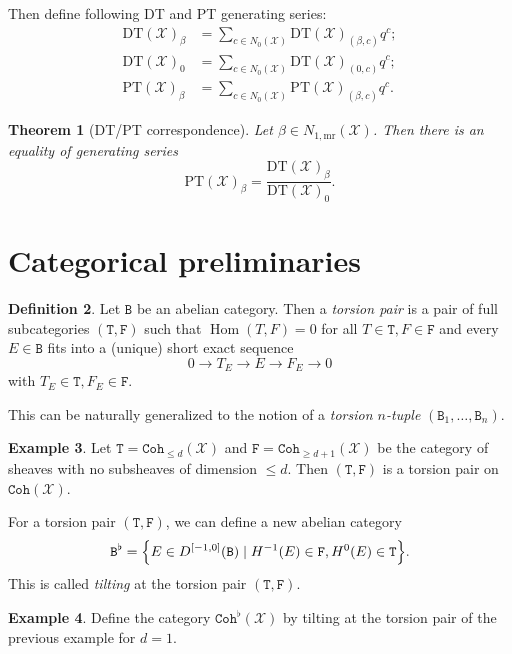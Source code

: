 \documentclass[leqno, openany]{memoir}
\newtheorem{thm}{Theorem}[section]
\theoremstyle{definition}
\newtheorem{defn}[thm]{Definition}
\newtheorem{exm}[thm]{Example}
\theoremstyle{remark}
\theoremstyle{plain}
\theoremstyle{definition}
\theoremstyle{remark}
\newcommand{\mc}[1]{\mathcal{#1}}
\newcommand{\mr}[1]{\mathrm{#1}}
\newcommand{\mt}[1]{\mathtt{#1}}
\DeclareMathOperator{\Hom}{Hom}
\begin{document}
Then define following DT and PT generating series:
\begin{align*}
    \mr{DT}(\mc{X})_{\beta} &= \sum_{c \in N_0(\mc{X})} \mr{DT}(\mc{X})_{(\beta, c)} q^c; \\
    \mr{DT}(\mc{X})_{0} &= \sum_{c \in N_0(\mc{X})} \mr{DT}(\mc{X})_{(0, c)} q^c; \\
    \mr{PT}(\mc{X})_{\beta} &= \sum_{c \in N_0(\mc{X})} \mr{PT}(\mc{X})_{(\beta, c)} q^c.
\end{align*}

\begin{thm}[DT/PT correspondence]
    Let $\beta \in N_{1, \mr{mr}}(\mc{X})$. Then there is an equality of generating series
    \[ \mr{PT}(\mc{X})_{\beta} = \frac{\mr{DT}(\mc{X})_{\beta}}{\mr{DT}(\mc{X})_0}. \]
\end{thm}

\section{Categorical preliminaries}

\begin{defn}
    Let $\mt{B}$ be an abelian category. Then a \textit{torsion pair} is a pair of full subcategories $(\mt{T}, \mt{F})$ such that $\Hom(T, F) = 0$ for all $T \in \mt{T}, F \in \mt{F}$ and every $E \in \mt{B}$ fits into a (unique) short exact sequence
    \[ 0 \to T_E \to E \to F_E \to 0 \]
    with $T_E \in \mt{T}, F_E \in \mt{F}$.
\end{defn}
This can be naturally generalized to the notion of a \textit{torsion $n$-tuple} $(\mt{B}_1, \ldots, \mt{B}_n)$.

\begin{exm}
    Let $\mt{T} = \mt{Coh}_{\leq d}(\mc{X})$ and $\mt{F} = \mt{Coh}_{\geq d+1}(\mc{X})$ be the category of sheaves with no subsheaves of dimension $\leq d$. Then $(\mt{T}, \mt{F})$ is a torsion pair on $\mt{Coh}(\mc{X})$.
\end{exm}

For a torsion pair $(\mt{T}, \mt{F})$, we can define a new abelian category 
\[ \mt{B}^{\flat} = \qty{E \in D^{[-1,0]}(\mt{B}) \mid H^{-1}(E) \in \mt{F}, H^0(E) \in \mt{T}}. \]
This is called \textit{tilting} at the torsion pair $(\mt{T}, \mt{F})$.

\begin{exm}
    Define the category $\mt{Coh}^{\flat}(\mc{X})$ by tilting at the torsion pair of the previous example for $d = 1$.
\end{exm}
\end{document}

